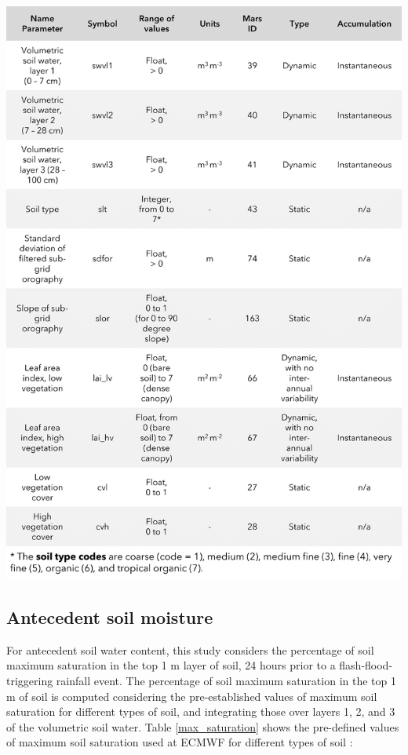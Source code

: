 \begin{table}[htbp]
\centering
{}
\includegraphics[width=\textwidth]{02_era5_params.png}
\label{table:parameters_used}
\end{table}


\subsection{Antecedent soil moisture}

For antecedent soil water content, this study considers the percentage of soil maximum saturation in the top 1 m layer of soil, 24 hours prior to a flash-flood-triggering rainfall event. The percentage of soil maximum saturation in the top 1 m of soil is computed considering the pre-established values of maximum soil saturation for different types of soil, and integrating those over layers 1, 2, and 3 of the volumetric soil water. Table \ref{max_saturation} shows the pre-defined values of maximum soil saturation used at ECMWF for different types of soil \citep{Balsamo_2009}:

